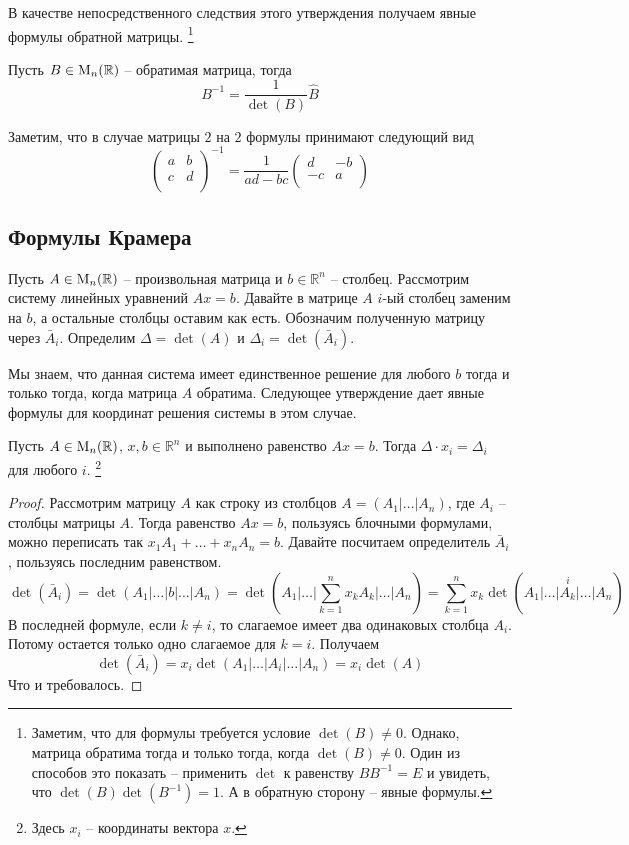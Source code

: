 В качестве непосредственного следствия этого утверждения получаем явные формулы обратной матрицы.%
\footnote{Заметим, что для формулы требуется условие $\det (B)\neq 0$.
Однако, матрица обратима тогда и только тогда, когда $\det(B)\neq 0$.
Один из способов это показать -- применить $\det$ к равенству $B B^{-1} = E$ и увидеть, что $\det(B) \det(B^{-1}) = 1$.
А в обратную сторону -- явные формулы.}

\begin{claim}
\label{claim::InvFormulas}
Пусть $B\in\operatorname{M}_{n}(\mathbb R)$ -- обратимая матрица, тогда 
\[
B^{-1} = \frac{1}{\det(B)}\hat B
\]
\end{claim}

Заметим, что в случае матрицы $2$ на $2$ формулы принимают следующий вид
\[
\begin{pmatrix}
{a}&{b}\\
{c}&{d}\\
\end{pmatrix}^{-1}
=
\frac{1}{ad - bc}
\begin{pmatrix}
{d}&{-b}\\
{-c}&{a}\\
\end{pmatrix}
\]

\subsection{Формулы Крамера}

Пусть $A\in\operatorname{M}_{n}(\mathbb R)$ -- произвольная матрица и $b\in\mathbb R^n$ -- столбец.
Рассмотрим систему линейных уравнений $Ax = b$.
Давайте в матрице $A$ $i$-ый столбец заменим на $b$, а остальные столбцы оставим как есть.
Обозначим полученную матрицу через $\bar A_i$.
Определим $\Delta = \det (A)$ и $\Delta_i = \det (\bar A_i)$.

Мы знаем, что данная система имеет единственное решение для любого $b$ тогда и только тогда, когда матрица $A$ обратима.
Следующее утверждение дает явные формулы для координат решения системы в этом случае.

\begin{claim}
\label{claim::CramerRule}
Пусть $A\in\operatorname{M}_{n}(\mathbb R)$, $x,b\in \mathbb R^n$ и выполнено равенство $Ax = b$.
Тогда $\Delta \cdot x_i = \Delta_i$ для любого $i$.%
\footnote{Здесь $x_i$ -- координаты вектора $x$.}
\end{claim}
\begin{proof}
Рассмотрим матрицу $A$ как строку из столбцов $A = (A_1|\ldots|A_n)$, где $A_i$ -- столбцы матрицы $A$.
Тогда равенство $Ax = b$, пользуясь блочными формулами, можно переписать так $x_1 A_1 + \ldots + x_n A_n = b$.
Давайте посчитаем определитель $\bar A_i$, пользуясь последним равенством.
\[
\det (\bar A_i) = \det(A_1|\ldots|b|\ldots|A_n) = \det(A_1|\ldots|\sum_{k=1}^n x_k A_k|\ldots|A_n) = \sum_{k=1}^n x_k \det (
\stackrel{i}{A_1|\ldots|A_k|\ldots|A_n})
\]
В последней формуле, если $k\neq i$, то слагаемое имеет два одинаковых столбца $A_i$.
Потому остается только одно слагаемое для $k = i$.
Получаем
\[
\det(\bar A_i) = x_i \det(A_1|\ldots|A_i|\ldots|A_n) = x_i \det(A)
\]
Что и требовалось.
\end{proof}

